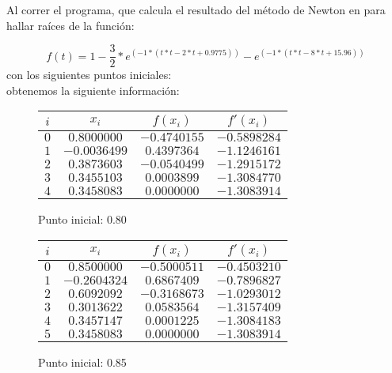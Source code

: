 
Al correr el programa, que calcula el resultado del método de Newton en para hallar raíces de la función:

\begin{equation*}
	f(t) = 1 - \dfrac{3}{2} * e^{(-1 * (t*t - 2*t + 0.9775))} - e^{(-1 * (t*t - 8*t + 15.96))}
\end{equation*}
con los siguientes puntos iniciales:
\begin{equation*}
[0.80, 0.85, 0.90, 0.95, 1.00, 1.05, 1.10, 1.15, 1.20]
\end{equation*}
obtenemos la siguiente información: 

\begin{figure}[H]
	\centering
	\caption{Punto inicial: 0.80}
	\begin{tabular}{|c|c|c|c|} \hline
		$i$ & $x_{i}$ & $f(x_{i})$ & $f'(x_{i})$ \\ \hline
		$0$ & $0.8000000$ & $-0.4740155$ & $-0.5898284$ \\ \hline
		$1$ & $-0.0036499$ & $0.4397364$ & $-1.1246161$ \\ \hline
		$2$ & $0.3873603$ & $-0.0540499$ & $-1.2915172$ \\ \hline
		$3$ & $0.3455103$ & $0.0003899$ & $-1.3084770$ \\ \hline
		$4$ & $0.3458083$ & $0.0000000$ & $-1.3083914$ \\ \hline
	\end{tabular}
\end{figure}
\begin{figure}[H]
	\centering
	\caption{Punto inicial: 0.85}
	\begin{tabular}{|c|c|c|c|} \hline
		$i$ & $x_{i}$ & $f(x_{i})$ & $f'(x_{i})$ \\ \hline
		$0$ & $0.8500000$ & $-0.5000511$ & $-0.4503210$ \\ \hline
		$1$ & $-0.2604324$ & $0.6867409$ & $-0.7896827$ \\ \hline
		$2$ & $0.6092092$ & $-0.3168673$ & $-1.0293012$ \\ \hline
		$3$ & $0.3013622$ & $0.0583564$ & $-1.3157409$ \\ \hline
		$4$ & $0.3457147$ & $0.0001225$ & $-1.3084183$ \\ \hline
		$5$ & $0.3458083$ & $0.0000000$ & $-1.3083914$ \\ \hline
	\end{tabular}
\end{figure}
